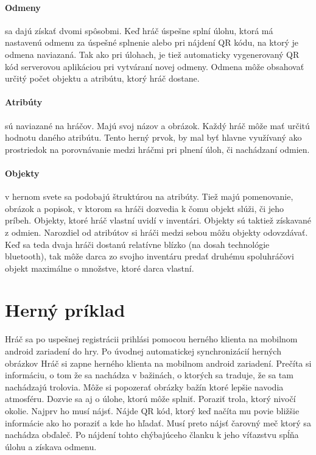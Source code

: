 \paragraph{Odmeny} sa dajú získať dvomi spôsobmi. Keď hráč úspešne splní úlohu, ktorá má nastavenú odmenu za úspešné splnenie alebo pri nájdení QR kódu, na ktorý je odmena naviazaná. Tak ako pri úlohach, je tiež automaticky vygenerovaný QR kód serverovou aplikáciou pri vytváraní novej odmeny. Odmena môže obsahovať určitý počet objektu a atribútu, ktorý hráč dostane.

\paragraph{Atribúty} sú naviazané na hráčov. Majú svoj názov a obrázok. Každý hráč môže mať určitú hodnotu daného atribútu. Tento herný prvok, by mal byť hlavne využívaný ako prostriedok na porovnávanie medzi hráčmi pri plnení úloh, či nachádzaní odmien. 

\paragraph{Objekty} v hernom svete sa podobajú štruktúrou na atribúty. Tiež majú pomenovanie, obrázok a popisok, v ktorom sa hráči dozvedia k čomu objekt slúži, či jeho príbeh. Objekty, ktoré hráč vlastní uvidí v inventári. Objekty sú taktiež získavané z odmien. Narozdiel od atribútov si hráči medzi sebou môžu objekty odovzdávať. Keď sa teda dvaja hráči dostanú relatívne blízko (na dosah technológie bluetooth), tak môže darca zo svojho inventáru predať druhému spoluhráčovi objekt maximálne o množstve, ktoré darca vlastní.

\section{Herný príklad}
Hráč sa po uspešnej registrácii prihlási pomocou herného klienta na mobilnom android zariadení do hry. Po úvodnej automatickej synchronizácií herných obrázkov 
Hráč si zapne herného klienta na mobilnom android zariadení. Prečíta si informáciu, o tom že sa nachádza v bažinách, o ktorých sa traduje, že sa tam nachádzajú trolovia. Môže si popozerať obrázky bažín ktoré lepšie navodia atmosféru. Dozvie sa aj o úlohe, ktorú môže splniť. Poraziť trola, ktorý nivočí okolie. Najprv ho musí nájsť. Nájde QR kód, ktorý keď načíta mu povie bližšie informácie ako ho poraziť a kde ho hľadať. Musí preto nájsť čarovný meč ktorý sa nachádza obďaleč. Po nájdení tohto chýbajúceho članku k jeho víťazstvu spĺňa úlohu a získava odmenu.
